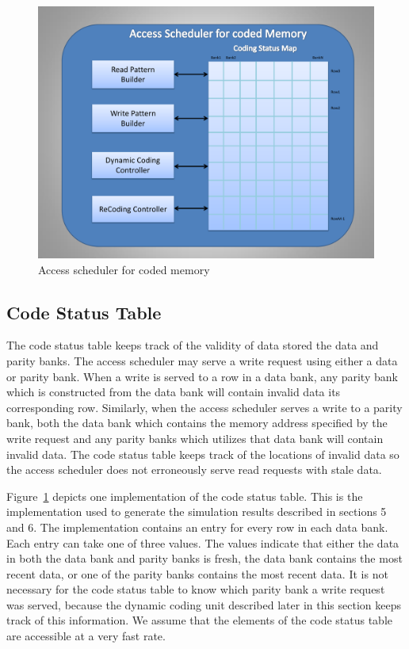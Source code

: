 \begin{figure}[tbp]
\centering
\includegraphics[width=0.7\linewidth]{fig/coded_access_scheduler.pdf}
\caption{
{Access scheduler for coded memory} }
\label{fig:coded_access_scheduler}
\end{figure}
\subsection{Code Status Table}
\label{sec:codeStatusTable}
The code status table keeps track of the validity of data stored the data and parity banks. The access scheduler may serve a write request using either a data or parity bank. When a write is served to a row in a data bank, any parity bank which is constructed from the data bank will contain invalid data its corresponding row. Similarly, when the access scheduler serves a write to a parity bank, both the data bank which contains the memory address specified by the write request and any parity banks which utilizes that data bank will contain invalid data. The code status table keeps track of the locations of invalid data so the access scheduler does not erroneously serve read requests with stale data.

{\color{blue}
Figure~\ref{fig:coded_access_scheduler} depicts one implementation of the code status table. This is the implementation used to generate the simulation results described in sections 5 and 6. The implementation contains an entry for every row in each data bank. Each entry can take one of three values. The values indicate that either the data in both the data bank and parity banks is fresh, the data bank contains the most recent data, or one of the parity banks contains the most recent data. It is not necessary for the code status table to know which parity bank a write request was served, because the dynamic coding unit described later in this section keeps track of this information. We assume that the elements of the code status table are accessible at a very fast rate. 
}


